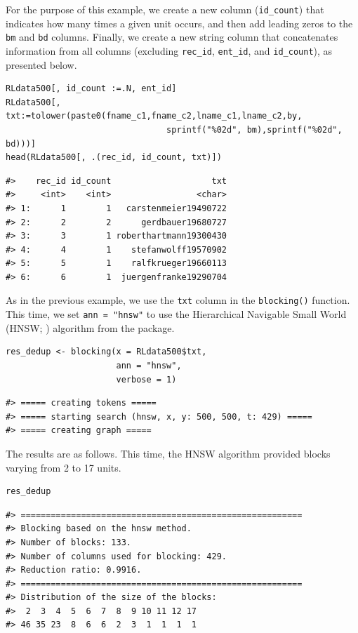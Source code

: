 For the purpose of this example, we create a new column (\texttt{id\_count}) that
indicates how many times a given unit occurs, and then add leading zeros
to the \texttt{bm} and \texttt{bd} columns. Finally, we create a new string column
that concatenates information from all columns (excluding \texttt{rec\_id},
\texttt{ent\_id}, and \texttt{id\_count}), as presented below.

\begin{verbatim}
RLdata500[, id_count :=.N, ent_id]
RLdata500[, txt:=tolower(paste0(fname_c1,fname_c2,lname_c1,lname_c2,by,
                                sprintf("%02d", bm),sprintf("%02d", bd)))]
head(RLdata500[, .(rec_id, id_count, txt)])
\end{verbatim}

\begin{verbatim}
#>    rec_id id_count                    txt
#>     <int>    <int>                 <char>
#> 1:      1        1   carstenmeier19490722
#> 2:      2        2      gerdbauer19680727
#> 3:      3        1 roberthartmann19300430
#> 4:      4        1    stefanwolff19570902
#> 5:      5        1    ralfkrueger19660113
#> 6:      6        1  juergenfranke19290704
\end{verbatim}

As in the previous example, we use the \texttt{txt} column in the \texttt{blocking()}
function. This time, we set \texttt{ann\ =\ "hnsw"} to use the Hierarchical
Navigable Small World (HNSW; \citet{malkov2018efficient}) algorithm from the
 package.

\begin{verbatim}
res_dedup <- blocking(x = RLdata500$txt,
                      ann = "hnsw",
                      verbose = 1)
\end{verbatim}

\begin{verbatim}
#> ===== creating tokens =====
#> ===== starting search (hnsw, x, y: 500, 500, t: 429) =====
#> ===== creating graph =====
\end{verbatim}

The results are as follows. This time, the HNSW algorithm provided blocks
varying from 2 to 17 units.

\begin{verbatim}
res_dedup
\end{verbatim}

\begin{verbatim}
#> ========================================================
#> Blocking based on the hnsw method.
#> Number of blocks: 133.
#> Number of columns used for blocking: 429.
#> Reduction ratio: 0.9916.
#> ========================================================
#> Distribution of the size of the blocks:
#>  2  3  4  5  6  7  8  9 10 11 12 17 
#> 46 35 23  8  6  6  2  3  1  1  1  1
\end{verbatim}

